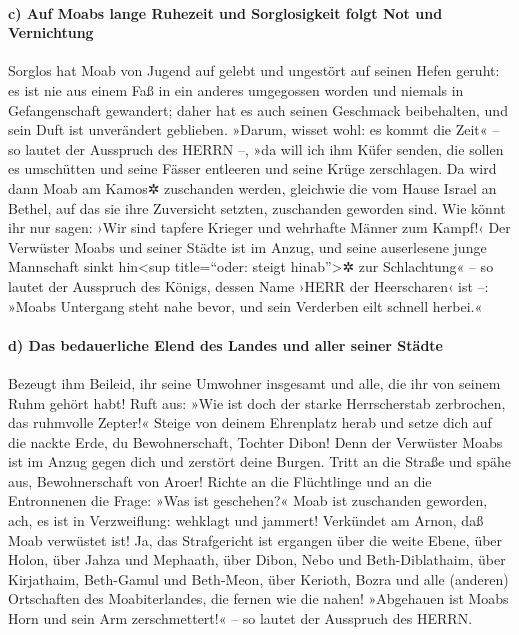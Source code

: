 \hypertarget{c-auf-moabs-lange-ruhezeit-und-sorglosigkeit-folgt-not-und-vernichtung}{%
\paragraph{c) Auf Moabs lange Ruhezeit und Sorglosigkeit folgt Not und
Vernichtung}\label{c-auf-moabs-lange-ruhezeit-und-sorglosigkeit-folgt-not-und-vernichtung}}

Sorglos hat Moab von Jugend auf gelebt und ungestört auf
seinen Hefen geruht: es ist nie aus einem Faß in ein anderes umgegossen
worden und niemals in Gefangenschaft gewandert; daher hat es auch seinen
Geschmack beibehalten, und sein Duft ist unverändert geblieben.
»Darum, wisset wohl: es kommt die Zeit« -- so lautet der
Ausspruch des HERRN --, »da will ich ihm Küfer senden, die sollen es
umschütten und seine Fässer entleeren und seine Krüge zerschlagen.
Da wird dann Moab am Kamos✲ zuschanden werden, gleichwie
die vom Hause Israel an Bethel, auf das sie ihre Zuversicht setzten,
zuschanden geworden sind. Wie könnt ihr nur sagen: ›Wir
sind tapfere Krieger und wehrhafte Männer zum Kampf!‹ Der
Verwüster Moabs und seiner Städte ist im Anzug, und seine auserlesene
junge Mannschaft sinkt hin\textless sup title=``oder: steigt
hinab''\textgreater✲ zur Schlachtung« -- so lautet der Ausspruch des
Königs, dessen Name ›HERR der Heerscharen‹ ist --: »Moabs
Untergang steht nahe bevor, und sein Verderben eilt schnell herbei.«

\hypertarget{d-das-bedauerliche-elend-des-landes-und-aller-seiner-stuxe4dte}{%
\paragraph{d) Das bedauerliche Elend des Landes und aller seiner
Städte}\label{d-das-bedauerliche-elend-des-landes-und-aller-seiner-stuxe4dte}}

Bezeugt ihm Beileid, ihr seine Umwohner insgesamt und
alle, die ihr von seinem Ruhm gehört habt! Ruft aus: »Wie ist doch der
starke Herrscherstab zerbrochen, das ruhmvolle Zepter!«
Steige von deinem Ehrenplatz herab und setze dich auf die
nackte Erde, du Bewohnerschaft, Tochter Dibon! Denn der Verwüster Moabs
ist im Anzug gegen dich und zerstört deine Burgen. Tritt
an die Straße und spähe aus, Bewohnerschaft von Aroer! Richte an die
Flüchtlinge und an die Entronnenen die Frage: »Was ist geschehen?«
Moab ist zuschanden geworden, ach, es ist in
Verzweiflung: wehklagt und jammert! Verkündet am Arnon, daß Moab
verwüstet ist! Ja, das Strafgericht ist ergangen über die
weite Ebene, über Holon, über Jahza und Mephaath, über
Dibon, Nebo und Beth-Diblathaim, über Kirjathaim,
Beth-Gamul und Beth-Meon, über Kerioth, Bozra und alle
(anderen) Ortschaften des Moabiterlandes, die fernen wie die nahen!
»Abgehauen ist Moabs Horn und sein Arm zerschmettert!« --
so lautet der Ausspruch des HERRN.

